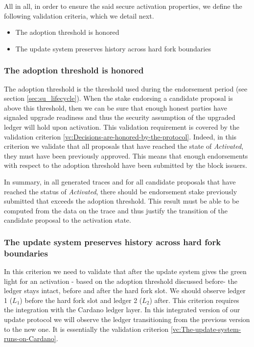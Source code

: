 All in all, in order to ensure the said secure activation properties, we define
the following validation criteria, which we detail next.
\begin{itemize}
	\item The adoption threshold is honored
	\item The update system preserves history across hard fork boundaries
\end{itemize}

\subsubsection{The adoption threshold is
	honored}\label{vc:The_adoption_threshold_is_honored}
The adoption threshold is the threshold used during the endorsement period (see
section \ref{sec:su_lifecycle}). When the stake endorsing a candidate proposal
is above this threshold, then we can be sure that enough honest parties have
signaled upgrade readiness and thus the security assumption of the upgraded
ledger
will hold upon activation. This validation requirement is covered by the
validation criterion \ref{vc:Decisions-are-honored-by-the-protocol}. Indeed, in
this criterion we validate that all proposals that have reached the state of
\emph{Activated}, they must have been previously approved. This means that
enough endorsements with respect to the adoption threshold have been submitted
by the block issuers.

In summary, in all generated traces and for all candidate
proposals that have reached the status of \emph{Activated}, there should be
endorsement stake previously submitted that exceeds the adoption threshold.
This result must be able to be computed from the data on the trace and thus
justify the transition of the candidate proposal to the activation state.

\subsubsection{The update system preserves history across hard fork
	boundaries}\label{vc:The_update_system_preserves_history_across_hard_fork_boundaries}
In this criterion we need to validate that after the update system gives the
green light for an activation - based on the adoption threshold discussed
before- the ledger stays intact, before and after the hard fork slot. We should
observe ledger 1 ($L_1$) before the hard fork slot and ledger 2 ($L_2$) after. 
This criterion
requires the integration with the Cardano ledger layer. In this integrated
version of our update protocol we will observe the ledger transitioning from
the previous version to the new one. It is essentially the validation criterion
\ref{vc:The-update-system-runs-on-Cardano}.

